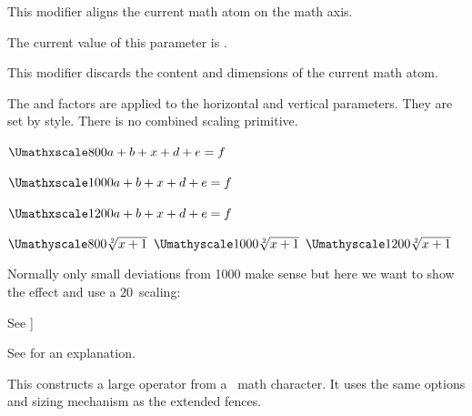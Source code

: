 This modifier aligns the current math atom on the math axis.

\stopnewprimitive

\startnewprimitive[title={\prm {Umathvextensiblevariant}}]

The current value of this parameter is \CurrentMathVariant
\Umathvextensiblevariant.

\stopnewprimitive

\startnewprimitive[title={\prm {Umathvoid}}]

This modifier discards the content and dimensions of the current math atom.

\stopnewprimitive

\startnewprimitive[title={\prm {Umathxscale}}]

The  and  factors are applied to the
horizontal and vertical parameters. They are set by style. There is no combined
scaling primitive.

\startbuffer
$\Umathxscale\textstyle  800 a + b + x + d + e = f $\par
$\Umathxscale\textstyle 1000 a + b + x + d + e = f $\par
$\Umathxscale\textstyle 1200 a + b + x + d + e = f $\blank

$\Umathyscale\textstyle  800 \sqrt[2]{x+1}$\quad
$\Umathyscale\textstyle 1000 \sqrt[2]{x+1}$\quad
$\Umathyscale\textstyle 1200 \sqrt[2]{x+1}$\blank
\stopbuffer

\typebuffer

Normally only small deviations from 1000 make sense but here we want to show the
effect and use a 20\percent\ scaling:

\getbuffer

\stopnewprimitive

\startnewprimitive[title={\prm {Umathyscale}}]

See ]

\stopnewprimitive

\startnewprimitive[title={\prm {Umiddle}}]

See  for an explanation.

\stopnewprimitive

\startnewprimitive[title={\prm {Uoperator}}]

This constructs a large operator from a \UNICODE\ math character. It uses the
same options and sizing mechanism as the extended fences.

\stopnewprimitive

\startnewprimitive[title={\prm {Uover}}]

